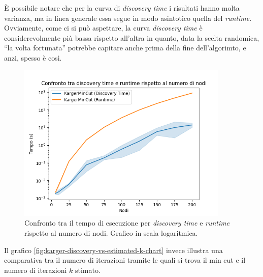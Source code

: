 \noindent È possibile notare che per la curva di \emph{discovery time}
i risultati hanno molta varianza, ma in linea generale essa segue in
modo asintotico quella del \emph{runtime}.\\

\noindent Ovviamente, come ci si può aspettare, la curva
\emph{discovery time} è considerevolmente più bassa rispetto all'altra
in quanto, data la scelta randomica, ``la volta fortunata'' potrebbe
capitare anche prima della fine dell'algorimto, e anzi, spesso è così.

\begin{figure}[H]
    \centering

    \includegraphics[width=0.9\textwidth]{./images/Confronto_tra_discovery_time_e_runtime_rispetto_al_numero_di_nodi.png}

    \caption{Confronto tra il tempo di esecuzione per \emph{discovery time} e \emph{runtime} rispetto al numero di nodi. Grafico in scala logaritmica.}
    \label{fig:karger-discovery-vs-program-time-chart}
\end{figure}

Il grafico \ref{fig:karger-discovery-vs-estimated-k-chart} invece
illustra una comparativa tra il numero di iterazioni tramite le quali
si trova il min cut e il numero di iterazioni $k$ stimato.

